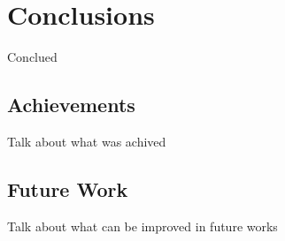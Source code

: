 
\chapter{Conclusions}
\label{chapter:conclusions}

Conclued

\section{Achievements}
\label{section:achievements}

Talk about what was achived


\section{Future Work}
\label{section:future}

Talk about what can be improved in future works
